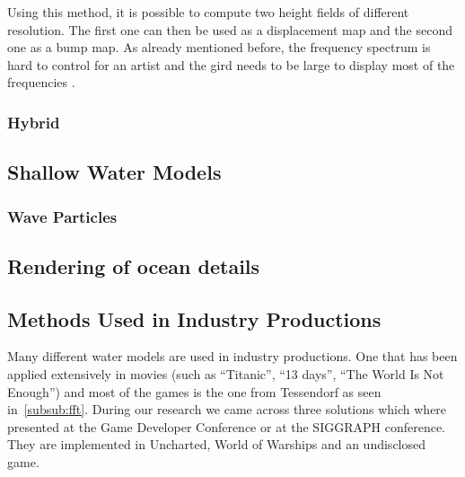 Using this method, it is possible to compute two height fields of different
resolution. The first one can then be used as a displacement map and the second
one as a bump map.
As already mentioned before, the frequency spectrum is hard to control for an
artist and the gird needs to be large to display most of the frequencies
\autocite{gonzalez2016rendering}.


\subsubsection{Hybrid}

\subsection{Shallow Water Models}\label{subsec:shallow_water}

\subsubsection{Wave Particles}\label{subsub:wave_particles}

\subsection{Rendering of ocean details}\label{subsec:ocean_details}

\subsection{Methods Used in Industry Productions}\label{subsec:methods_industry}


Many different water models are used in industry productions. One that has been
applied extensively in movies (such as ``Titanic'', ``13 days'', ``The World Is
Not Enough'') and most of the games is the one from Tessendorf
\autocite{tessendorf2001simulating} as seen in~\ref{subsub:fft}.  During our
research we came across three solutions which where presented at the Game
Developer Conference or at the SIGGRAPH conference. They are implemented in
Uncharted, World of Warships and an undisclosed game.

